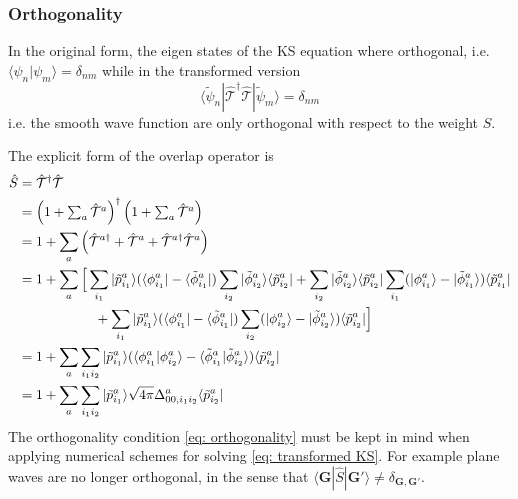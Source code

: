 \documentclass[a4paper]{article}
\newcommand{\f}[1]{\mathbf{#1}}
\newcommand{\s}[1]{\tilde{#1}}
\newcommand{\h}[1]{\hat{#1}}
\newcommand{\T}{\hat{\mathcal{T}}}
\newcommand{\bra}[1]{\langle #1 |}
\newcommand{\ket}[1]{| #1 \rangle}
\newcommand{\braket}[2]{\langle #1 | #2 \rangle}
\begin{document}
\subsubsection{Orthogonality}
In the original form, the eigen states of the KS equation where
orthogonal, i.e. $\braket{\psi_n}{\psi_m} = \delta_{nm}$ while in the
transformed version
%
\begin{equation}
  \label{eq: orthogonality}
  \bra{\s{\psi}_n}\T^\dagger \T\ket{\s{\psi}_m} = \delta_{nm}
\end{equation}
%
i.e. the smooth wave function are only orthogonal with respect to the
weight $\h{S}$.
\par The explicit form of the overlap operator is
%
\begin{equation}\label{eq: overlap}
  \begin{split}
  \h{S} &= \T^\dagger \T \\
        &= \left(1+\textstyle\sum_a \T^a\right)^\dagger \left(1+\textstyle\sum_a \T^a\right)\\
        &= {1} + \sum_a \left( \T^{a\dagger} + \T^a + \T^{a\dagger}\T^a\right)\\
        &= {1} + \sum_a \Big[\sum_{i_1} \ket{\s{p}_{i_1}^a}(\bra{\phi_{i_1}^a} - \bra{\s{\phi}_{i_1}^a}) \sum_{i_2} \ket{\s{\phi}_{i_2}^a}\bra{\s{p}_{i_2}^a} + \sum_{i_2} \ket{\s{\phi}_{i_2}^a}\bra{\s{p}_{i_2}^a} \sum_{i_1}(\ket{\phi_{i_1}^a} - \ket{\s{\phi}_{i_1}^a})\bra{\s{p}_{i_1}^a} \\
        &\hspace*{20mm} + \sum_{i_1} \ket{\s{p}_{i_1}^a}(\bra{\phi_{i_1}^a} - \bra{\s{\phi}_{i_1}^a})\sum_{i_2}(\ket{\phi_{i_2}^a} - \ket{\s{\phi}_{i_2}^a})\bra{\s{p}_{i_2}^a}\Big]\\
        &= {1} + \sum_a \sum_{i_1i_2} \ket{\s{p}_{i_1}^a}(\braket{\phi_{i_1}^a}{\phi_{i_2}^a} - \braket{\s{\phi}_{i_1}^a}{\s{\phi}_{i_2}^a})\bra{\s{p}_{i_2}^a}\\
        &= {1} + \sum_a \sum_{i_1i_2} \ket{\s{p}_{i_1}^a}\sqrt{4\pi}\Delta^a_{00,i_1i_2}\bra{\s{p}_{i_2}^a}
  \end{split}
\end{equation}
%
The orthogonality condition \ref{eq: orthogonality} must be kept in
mind when applying numerical schemes for solving \ref{eq:
  transformed KS}. For example plane waves are no longer orthogonal,
in the sense that $\bra{\f{G}} \h{S} \ket{\f{G}'} \neq \delta_{\f{G},
  \f{G}'}$.
\end{document}
